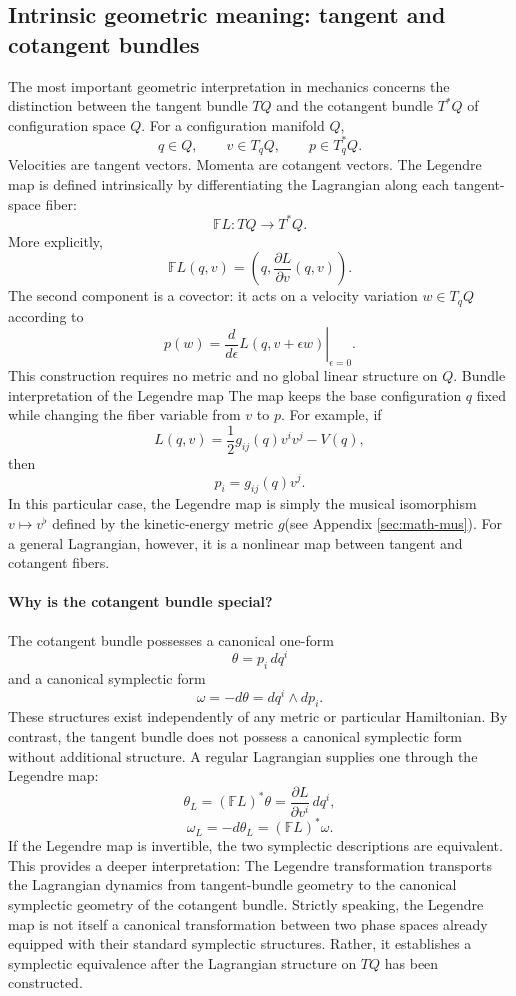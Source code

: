 \subsection{Intrinsic geometric meaning: tangent and cotangent bundles}
The most important geometric interpretation in mechanics concerns the
distinction between the tangent bundle \(TQ\) and the cotangent bundle \(T^*Q\)
of configuration space \(Q\).
For a configuration manifold \(Q\),
\[
q\in Q,\qquad v\in T_qQ,\qquad p\in T_q^*Q.
\]
Velocities are tangent vectors. Momenta are cotangent vectors.
The Legendre map is defined intrinsically by differentiating the Lagrangian
along each tangent-space fiber:
\[
\boxed{
\mathbb FL:TQ\longrightarrow T^*Q.
}
\]
More explicitly,
\[
\boxed{
\mathbb FL(q,v)
=\left(q,\frac{\partial L}{\partial v}(q,v)\right).
}
\]
The second component is a covector: it acts on a velocity variation \(w\in
T_qQ\) according to
\[
p(w)=
\left.\frac{d}{d\epsilon}
L(q,v+\epsilon w)\right|_{\epsilon=0}.
\]
This construction requires no metric and no global linear structure on \(Q\).
Bundle interpretation of the Legendre map
The map keeps the base configuration \(q\) fixed while changing the fiber
variable from \(v\) to \(p\).
For example, if
\[
L(q,v)=\frac12 g_{ij}(q)v^iv^j-V(q),
\]
then
\[
p_i=g_{ij}(q)v^j.
\]
In this particular case, the Legendre map is simply the musical isomorphism
\(v\mapsto v^\flat\) defined by the kinetic-energy metric \(g\)(see Appendix
\ref{sec:math-mus}).
For a general Lagrangian, however, it is a nonlinear map between tangent and
cotangent fibers.

\paragraph{Why is the cotangent bundle special?}
The cotangent bundle possesses a canonical one-form
\[
\boxed{\theta=p_i\,dq^i}
\]
and a canonical symplectic form
\[
\boxed{\omega=-d\theta=dq^i\wedge dp_i.}
\]
These structures exist independently of any metric or particular Hamiltonian.
By contrast, the tangent bundle does not possess a canonical symplectic form
without additional structure.
A regular Lagrangian supplies one through the Legendre map:
\[
\theta_L=(\mathbb FL)^*\theta
=\frac{\partial L}{\partial v^i}\,dq^i,
\]
\[
\boxed{\omega_L=-d\theta_L=(\mathbb FL)^*\omega.}
\]
If the Legendre map is invertible, the two symplectic descriptions are
equivalent.
This provides a deeper interpretation:
The Legendre transformation transports the Lagrangian dynamics from
tangent-bundle geometry to the canonical symplectic geometry of the cotangent
bundle.
Strictly speaking, the Legendre map is not itself a canonical transformation
between two phase spaces already equipped with their standard symplectic
structures. Rather, it establishes a symplectic equivalence after the
Lagrangian structure on \(TQ\) has been constructed.

